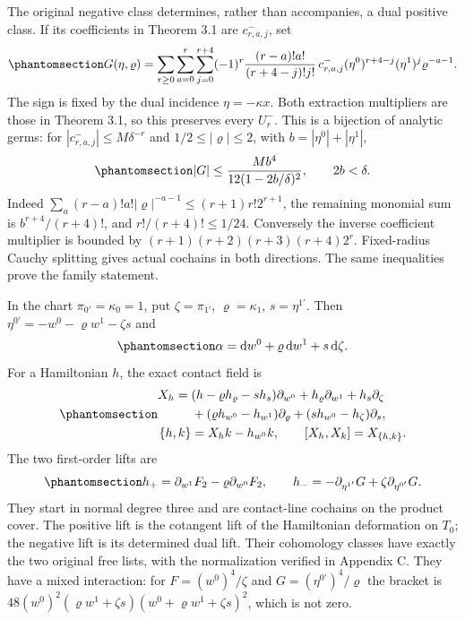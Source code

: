 \documentclass[
  english,
  11pt,
  reqno]{amsart}
\begin{document}
The original negative class determines, rather than accompanies, a dual
positive class. If its coefficients in Theorem 3.1 are \(c^-_{r,a,j}\),
set
\begin{equation}\protect\phantomsection\label{eq:gg-derived-dual-class}{
 G(\eta,\varrho)=
 \sum_{r\ge0}\sum_{a=0}^r\sum_{j=0}^{r+4}
 (-1)^r\frac{(r-a)!a!}{(r+4-j)!j!}\,
 c^-_{r,a,j}(\eta^0)^{r+4-j}(\eta^1)^j\varrho^{-a-1}.
}\end{equation} The sign is fixed by the dual incidence
\(\eta=-\kappa x\). Both extraction multipliers are those in Theorem
3.1, so this preserves every \(U_r^-\). This is a bijection of analytic
germs: for \(|c^-_{r,a,j}|\le M\delta^{-r}\) and
\(1/2\le|\varrho|\le2\), with \(b=|\eta^0|+|\eta^1|\),
\begin{equation}\protect\phantomsection\label{eq:gg-dual-convergence}{
 |G|\le\frac{Mb^4}{12(1-2b/\delta)^2},
 \qquad 2b<\delta.
}\end{equation} Indeed
\(\sum_a(r-a)!a!|\varrho|^{-a-1}\le(r+1)r!2^{r+1}\), the remaining
monomial sum is \(b^{r+4}/(r+4)!\), and \(r!/(r+4)!\le1/24\). Conversely
the inverse coefficient multiplier is bounded by
\((r+1)(r+2)(r+3)(r+4)2^r\). Fixed-radius Cauchy splitting gives actual
cochains in both directions. The same inequalities prove the family
statement.

In the chart \(\pi_{0'}=\kappa_0=1\), put \(\zeta=\pi_{1'}\),
\(\varrho=\kappa_1\), \(s=\eta^{1'}\). Then
\(\eta^{0'}=-w^0-\varrho w^1-\zeta s\) and
\begin{equation}\protect\phantomsection\label{eq:gg-cotangent-contact-form}{
 \alpha=\mathrm dw^0+\varrho\,\mathrm dw^1+s\,\mathrm d\zeta.
}\end{equation} For a Hamiltonian \(h\), the exact contact field is
\begin{equation}\protect\phantomsection\label{eq:gg-contact-hamiltonians}{
 \begin{aligned}
 X_h={}&(h-\varrho h_\varrho-sh_s)\partial_{w^0}
 +h_\varrho\partial_{w^1}+h_s\partial_\zeta\\
 &+(\varrho h_{w^0}-h_{w^1})\partial_\varrho
 +(s h_{w^0}-h_\zeta)\partial_s,\\
 \{h,k\}&=X_hk-h_{w^0}k,\qquad [X_h,X_k]=X_{\{h,k\}}.
 \end{aligned}
}\end{equation} The two first-order lifts are
\begin{equation}\protect\phantomsection\label{eq:gg-two-contact-lifts}{
 h_+=\partial_{w^1}F_2-\varrho\partial_{w^0}F_2,\qquad
 h_-=-\partial_{\eta^{1'}}G+\zeta\partial_{\eta^{0'}}G.
}\end{equation} They start in normal degree three and are contact-line
cochains on the product cover. The positive lift is the cotangent lift
of the Hamiltonian deformation on \(T_0\); the negative lift is its
determined dual lift. Their cohomology classes have exactly the two
original free lists, with the normalization verified in Appendix C. They
have a mixed interaction: for \(F=(w^0)^4/\zeta\) and
\(G=(\eta^{0'})^4/\varrho\) the bracket is
\(48(w^0)^2(\varrho w^1+\zeta s)(w^0+\varrho w^1+\zeta s)^2\), which is
not zero.
\end{document}
